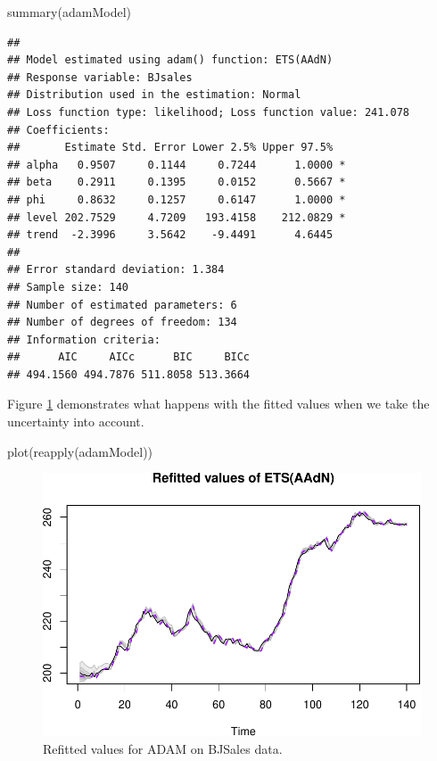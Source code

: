 \documentclass[
]{book}
\newenvironment{Shaded}{\begin{snugshade}}{\end{snugshade}}
\newcommand{\FunctionTok}[1]{\textcolor[rgb]{0.00,0.00,0.00}{#1}}
\newcommand{\NormalTok}[1]{#1}
\theoremstyle{definition}
\theoremstyle{definition}
\theoremstyle{definition}
\theoremstyle{definition}
\theoremstyle{remark}
\begin{document}
\begin{Shaded}
\begin{Highlighting}[]
\FunctionTok{summary}\NormalTok{(adamModel)}
\end{Highlighting}
\end{Shaded}

\begin{verbatim}
## 
## Model estimated using adam() function: ETS(AAdN)
## Response variable: BJsales
## Distribution used in the estimation: Normal
## Loss function type: likelihood; Loss function value: 241.078
## Coefficients:
##       Estimate Std. Error Lower 2.5% Upper 97.5%  
## alpha   0.9507     0.1144     0.7244      1.0000 *
## beta    0.2911     0.1395     0.0152      0.5667 *
## phi     0.8632     0.1257     0.6147      1.0000 *
## level 202.7529     4.7209   193.4158    212.0829 *
## trend  -2.3996     3.5642    -9.4491      4.6445  
## 
## Error standard deviation: 1.384
## Sample size: 140
## Number of estimated parameters: 6
## Number of degrees of freedom: 134
## Information criteria:
##      AIC     AICc      BIC     BICc 
## 494.1560 494.7876 511.8058 513.3664
\end{verbatim}

Figure \ref{fig:adamModelPIRefitted} demonstrates what happens with the fitted values when we take the uncertainty into account.

\begin{Shaded}
\begin{Highlighting}[]
\FunctionTok{plot}\NormalTok{(}\FunctionTok{reapply}\NormalTok{(adamModel))}
\end{Highlighting}
\end{Shaded}

\begin{figure}
\centering
\includegraphics{Svetunkov--2022----ADAM_files/figure-latex/adamModelPIRefitted-1.pdf}
\caption{\label{fig:adamModelPIRefitted}Refitted values for ADAM on BJSales data.}
\end{figure}
\end{document}
